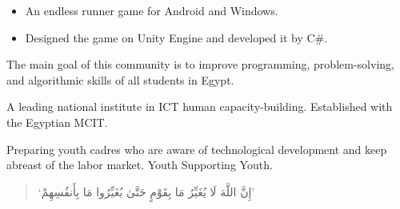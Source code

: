 \documentclass[10pt,a4paper,ragged2e,withhyper]{altacv}
\begin{document}
\begin{paracol}{2}
\begin{itemize}
    \item An endless runner game for Android and Windows.
    \item Designed the game on Unity Engine and developed it by C\#.
\end{itemize}


The main goal of this community is to improve programming, problem-solving, and algorithmic skills of all students in Egypt.

\divider

A leading national institute in ICT human capacity-building. Established with the Egyptian MCIT.

\divider

Preparing youth cadres who are aware of technological development and keep abreast of the labor market. Youth Supporting Youth.

\switchcolumn


\begin{quote}
    \begin{RLtext}
        `إِنَّ اللَّهَ لَا يُغَيِّرُ مَا بِقَوْمٍ حَتَّىٰ يُغَيِّرُوا مَا بِأَنفُسِهِمْ'
    \end{RLtext}
\end{quote}



\end{paracol}
\end{document}

